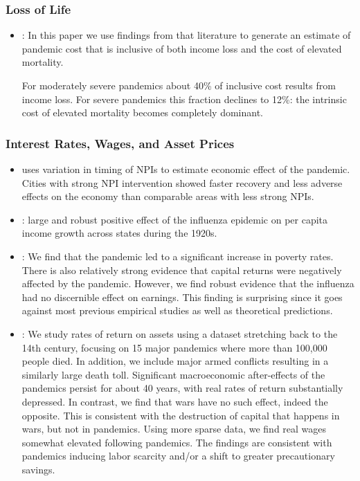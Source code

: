 \documentclass[12pt,a4paper]{article}
\begin{document}
\subsubsection{Loss of Life}

\begin{itemize}
	\item \cite{fanInclusiveCostPandemic2016}: In this paper we use findings from that literature to generate an
	estimate of pandemic cost that is inclusive of both income loss and the cost of elevated mortality.
	
	For moderately severe pandemics about 40\% of inclusive cost results from income loss. For
	severe pandemics this fraction declines to 12\%: the intrinsic cost of elevated mortality becomes
	completely dominant.
\end{itemize}

\subsubsection{Interest Rates, Wages, and Asset Prices}

\begin{itemize}
	\item \cite{correiaPandemicsDepressEconomy2020} uses variation in timing of NPIs to estimate economic effect of the pandemic. Cities with strong NPI intervention showed faster recovery and less adverse effects on the economy than comparable areas with less strong NPIs.
	\item \cite{brainerdEconomicEffects19182003}: large and robust positive effect of the influenza epidemic on per capita income growth across states during the 1920s. 
	\item \cite{karlssonImpact1918Spanish2014}: We find that the pandemic led to a significant increase in poverty rates.
	There is also relatively strong evidence that capital returns were negatively affected by the pandemic.
	 However, we find robust evidence that the influenza had no discernible effect on earnings.
	 Thisfinding is surprising since it goes against most previous empirical studies as well as theoretical predictions.
	
	\item \cite{jordaLongerrunEconomicConsequences2020}: We study rates of return on assets
	using a dataset stretching back to the 14th century, focusing on 15 major pandemics
	where more than 100,000 people died. In addition, we include major armed conflicts
	resulting in a similarly large death toll. Significant macroeconomic after-effects of the
	pandemics persist for about 40 years, with real rates of return substantially depressed.
	In contrast, we find that wars have no such effect, indeed the opposite. This is consistent
	with the destruction of capital that happens in wars, but not in pandemics. Using
	more sparse data, we find real wages somewhat elevated following pandemics. The
	findings are consistent with pandemics inducing labor scarcity and/or a shift to greater
	precautionary savings.
\end{itemize}
\end{document}
